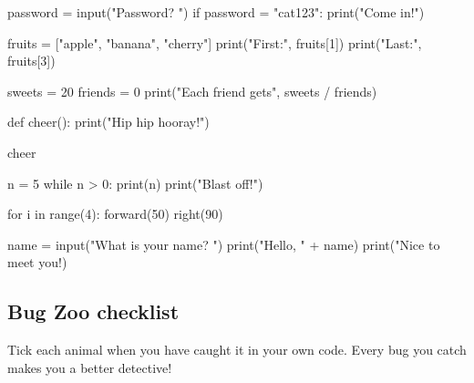 \begin{code}
password = input("Password? ")
if password = "cat123":
    print("Come in!")
\end{code}
\bzruled

\begin{code}
fruits = ["apple", "banana", "cherry"]
print("First:", fruits[1])
print("Last:", fruits[3])
\end{code}
\bzruled

\begin{code}
sweets = 20
friends = 0
print("Each friend gets", sweets / friends)
\end{code}
\bzruled

\begin{code}
def cheer():
    print("Hip hip hooray!")

cheer
\end{code}
\bzruled

\begin{code}
n = 5
while n > 0:
    print(n)
print("Blast off!")
\end{code}
\bzruled

\begin{code}
for i in range(4):
    forward(50)
right(90)
\end{code}
\bzruled

\begin{code}
name = input("What is your name? ")
print("Hello, " + name)
print("Nice to meet you!)
\end{code}
\bzruled

\subsection*{Bug Zoo checklist}

Tick each animal when you have caught it in your own code. Every bug you catch makes you a better detective!

